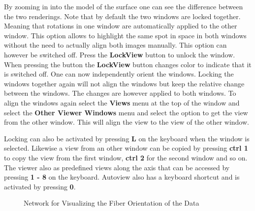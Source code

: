 \documentclass[fleqn,11pt,openany]{book}
\begin{document}
By zooming in into the model of the surface one can see the difference between the two renderings. Note that by default the two windows are locked together. Meaning that rotations in one window are automatically applied to the other window. This option allows to highlight the same spot in space in both windows without the need to actually align both images manually. This option can however be switched off. Press the {\bf LockView} button to unlock the window. When pressing the button the {\bf LockView} button changes color to indicate that it is switched off. One can now independently orient the windows. Locking the windows together again will not align the windows but keep the relative change between the windows. The changes are however applied to both windows. To align the windows again select the {\bf Views} menu at the top of the window and select the {\bf Other Viewer Windows} menu and select the option to get the view from the other window. This will align the view to the view of the other window. 

Locking can also be activated by pressing {\bf L} on the keyboard when the window is selected. Likewise a view from an other window can be copied by pressing {\bf ctrl 1} to copy the view from the first window, {\bf ctrl 2} for the second window and so on. The viewer also as predefined views along the axis that can be accessed by pressing {\bf 1 - 8} on the keyboard. Autoview also has a keyboard shortcut and is activated by pressing {\bf 0}. 

\begin{figure}
\caption{Network for Visualizing the Fiber Orientation of the Data}\label{fig:VectorNetwork}
\end{figure}
\end{document}
